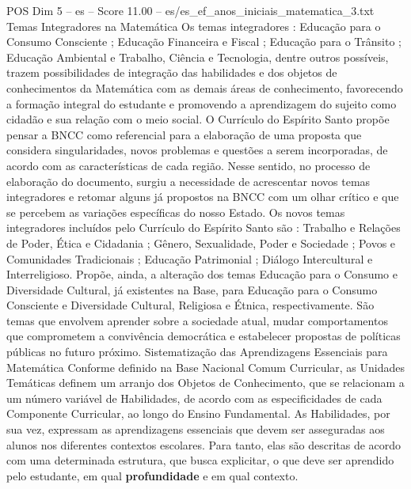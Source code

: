 \begin{textsample}{POS Dim 5 – es – Score 11.00 – es/es\_ef\_anos\_iniciais\_matematica\_3.txt}  \label{ex:f5_pos_102}
Temas Integradores na Matemática Os temas integradores : Educação para o Consumo Consciente ; Educação Financeira e Fiscal ; Educação para o Trânsito ; Educação Ambiental e Trabalho, Ciência e Tecnologia, dentre outros possíveis, trazem possibilidades de integração das habilidades e dos objetos de conhecimentos da Matemática com as demais áreas de conhecimento, favorecendo a formação integral do estudante e promovendo a aprendizagem do sujeito como cidadão e sua relação com o meio social.
O Currículo do Espírito Santo propõe pensar a BNCC como referencial para a elaboração de uma proposta que considera singularidades, novos problemas e questões a serem incorporadas, de acordo com as características de cada região.
Nesse sentido, no processo de elaboração do documento, surgiu a necessidade de acrescentar novos temas integradores e retomar alguns já propostos na BNCC com um olhar crítico e que se percebem as variações específicas do nosso Estado.
Os novos temas integradores incluídos pelo Currículo do Espírito Santo são : Trabalho e Relações de Poder, Ética e Cidadania ; Gênero, Sexualidade, Poder e Sociedade ; Povos e Comunidades Tradicionais ; Educação Patrimonial ; Diálogo Intercultural e Interreligioso.
Propõe, ainda, a alteração dos temas Educação para o Consumo e Diversidade Cultural, já existentes na Base, para Educação para o Consumo Consciente e Diversidade Cultural, Religiosa e Étnica, respectivamente.
São temas que envolvem aprender sobre a sociedade atual, mudar comportamentos que comprometem a convivência democrática e estabelecer propostas de políticas públicas no futuro próximo.
Sistematização das Aprendizagens Essenciais para Matemática Conforme definido na Base Nacional Comum Curricular, as Unidades Temáticas definem um arranjo dos Objetos de Conhecimento, que se relacionam a um número variável de Habilidades, de acordo com as especificidades de cada Componente Curricular, ao longo do Ensino Fundamental.
As Habilidades, por sua vez, expressam as aprendizagens essenciais que devem ser asseguradas aos alunos nos diferentes contextos escolares.
Para tanto, elas são descritas de acordo com uma determinada estrutura, que busca explicitar, o que deve ser aprendido pelo estudante, em qual \textbf{profundidade} e em qual contexto.

\end{textsample}
